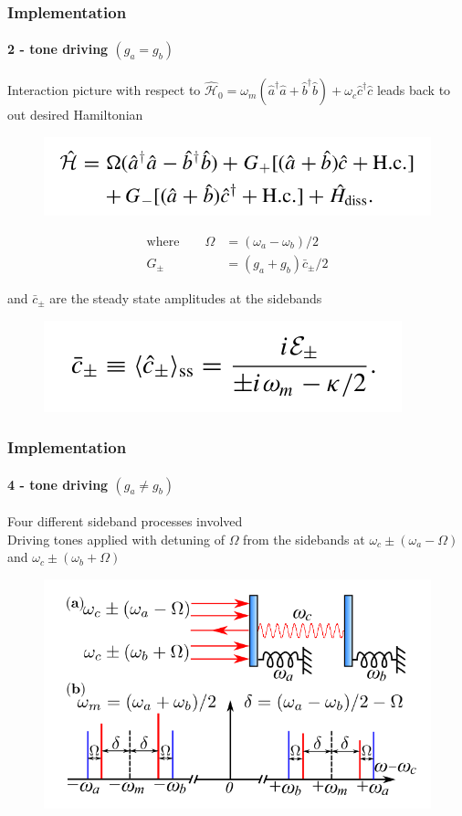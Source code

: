 \documentclass[aspectratio=43]{beamer}
\begin{document}
\begin{frame}
	
	\frametitle{Implementation}
	\framesubtitle{2 - tone driving $(g_{a} = g_{b})$}

	Interaction picture with respect to $\hat{\mathcal{H}}_{0} = \omega_{m}(\hat{a}^{\dagger}\hat{a} + \hat{b}^{\dagger}\hat{b}) + \omega_{c}\hat{c}^{\dagger}\hat{c}$ leads back to out desired Hamiltonian
	
	\begin{figure}
		\includegraphics[width = 7 cm]{plots/hamiltonian_4.png}
	\end{figure}
	
	\begin{align}
		\textrm{where} \qquad \Omega &= (\omega_{a} - \omega_{b}) / 2 \nonumber \\
		G_{\pm} &= (g_{a} + g_{b})\bar{c}_{\pm} / 2 \nonumber
	\end{align}
	
	\vspace{0.5 cm}
	
	and $\bar{c}_{\pm}$ are the steady state amplitudes at the sidebands
	\begin{figure}
		\includegraphics[width = 5 cm]{plots/ss_2_tone.png}
	\end{figure}

\end{frame}

\begin{frame}
	
	\frametitle{Implementation}
	\framesubtitle{4 - tone driving $(g_{a} \neq g_{b})$}
	
	Four different sideband processes involved\\
	Driving tones applied with detuning of $\Omega$ from the sidebands at $\omega_{c} \pm (\omega_{a} - \Omega)$ and $\omega_{c} \pm (\omega_{b} + \Omega)$
	
	\begin{figure}
		\includegraphics[width = 7 cm]{plots/plot_4_tone.png}
	\end{figure}	

\end{frame}
\end{document}
